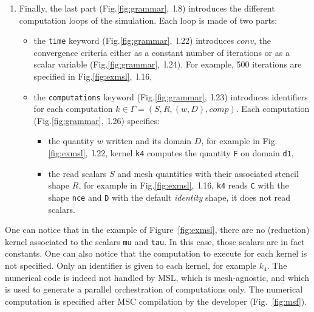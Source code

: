\begin{enumerate}
\item Finally, the last part (Fig.\ref{fig:grammar},~l.8) introduces the different computation loops of the simulation. Each loop is made of two parts:
\begin{itemize}
\item the \texttt{time} keyword (Fig.\ref{fig:grammar},~l.22) introduces $conv$, the convergence criteria either as a constant number of iterations or as a scalar variable (Fig.\ref{fig:grammar},~l.24). For example, 500 iterations are specified in Fig.\ref{fig:exmsl},~l.16,
\item the \texttt{computations} keyword (Fig.\ref{fig:grammar},~l.23) introduces identifiers for each computation $k\in\Gamma=(S,R,(w,D),comp)$. Each computation (Fig.\ref{fig:grammar},~l.26) specifies:
\begin{itemize}
 \item the quantity $w$ written and its domain $D$, for example in Fig.\ref{fig:exmsl},~l.22, kernel \texttt{k4} computes the quantity \texttt{F} on domain \texttt{d1},
 \item the read scalars $S$ and mesh quantities with their associated stencil shape $R$, for example in Fig.\ref{fig:exmsl},~l.16, \texttt{k4} reads \texttt{C} with the shape \texttt{nce} and \texttt{D} with the default \textit{identity} shape, it does not read scalars.
 \end{itemize}
\end{itemize}
\end{enumerate}

One can notice that in the example of Figure~\ref{fig:exmsl}, there are no (reduction) kernel associated to the scalars \texttt{mu} and \texttt{tau}.
In this case, those scalars are in fact constants.
One can also notice that the computation to execute for each kernel is not specified. Only an identifier is given to each kernel, for example $k_4$. The numerical code is indeed not handled by MSL, which is mesh-agnostic, and which is used to generate a parallel orchestration of computations only. The numerical computation is specified after MSC compilation by the developer (Fig.~\ref{fig:msf}).
